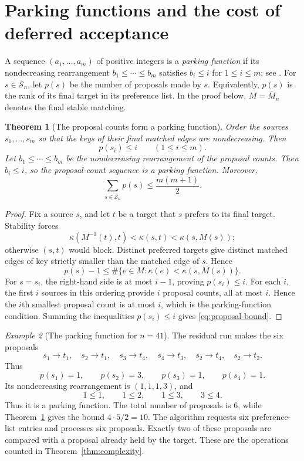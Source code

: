 \documentclass[11pt]{amsart}
\newtheorem{theorem}{Theorem}[section]
\theoremstyle{definition}
\theoremstyle{remark}
\newtheorem{example}[theorem]{Example}
\newcommand{\Sbar}{\overline{\mathcal S}_n}
\begin{document}
\section{Parking functions and the cost of deferred acceptance}\label{sec:complexity}

A sequence $(a_1,\ldots,a_m)$ of positive integers is a \emph{parking
function} if its nondecreasing rearrangement $b_1\le\cdots\le b_m$ satisfies
$b_i\le i$ for $1\le i\le m$; see \cite{KonheimWeiss,StanleyParking}.
For $s\in\Sbar$, let $p(s)$ be the number of proposals made by $s$.
Equivalently, $p(s)$ is the rank of its final target in its preference list.
In the proof below, $M=\overline M_n$ denotes the final stable matching.

\begin{theorem}[The proposal counts form a parking function]
\label{thm:parking}
Order the sources $s_1,\ldots,s_m$ so that the keys of their final matched
edges are nondecreasing.  Then
\[
 p(s_i)\le i
 \qquad(1\le i\le m).
\]
Let $b_1\le\cdots\le b_m$ be the nondecreasing rearrangement of the proposal
counts.  Then $b_i\le i$, so the proposal-count sequence is a parking
function.  Moreover,
\begin{equation}\label{eq:proposal-bound}
 \sum_{s\in\Sbar}p(s)\le\frac{m(m+1)}2.
\end{equation}
\end{theorem}

\begin{proof}
Fix a source $s$, and let $t$ be a target that $s$ prefers to its final target.
Stability forces
\[
 \kappa(M^{-1}(t),t)<\kappa(s,t)<\kappa(s,M(s));
\]
otherwise $(s,t)$ would block.  Distinct preferred targets give distinct
matched edges of key strictly smaller than the matched edge of $s$.  Hence
\[
 p(s)-1\le
 \#\{e\in M:\kappa(e)<\kappa(s,M(s))\}.
\]
For $s=s_i$, the right-hand side is at most $i-1$, proving $p(s_i)\le i$.
For each $i$, the first $i$ sources in this ordering provide $i$ proposal
counts, all at most $i$.  Hence the $i$th smallest proposal count is at most
$i$, which is the parking-function condition.
Summing the inequalities $p(s_i)\le i$ gives \eqref{eq:proposal-bound}.
\end{proof}

\begin{example}[The parking function for $n=41$]
\label{ex:parking-41}
The residual run makes the six proposals
\[
 s_1\to t_1,
 \quad s_2\to t_1,
 \quad s_3\to t_4,
 \quad s_4\to t_3,
 \quad s_2\to t_4,
 \quad s_2\to t_2.
\]
Thus
\[
 p(s_1)=1,\qquad p(s_2)=3,\qquad p(s_3)=1,\qquad p(s_4)=1.
\]
Its nondecreasing rearrangement is $(1,1,1,3)$, and
\[
 1\le1,\qquad 1\le2,\qquad 1\le3,\qquad 3\le4.
\]
Thus it is a parking function.  The total number of proposals is $6$, while
Theorem~\ref{thm:parking} gives the bound
$4\cdot5/2=10$.  The algorithm requests six preference-list entries and
processes six proposals.  Exactly two of these proposals are compared with a
proposal already held by the target.  These are the operations counted in
Theorem~\ref{thm:complexity}.
\end{example}
\end{document}
